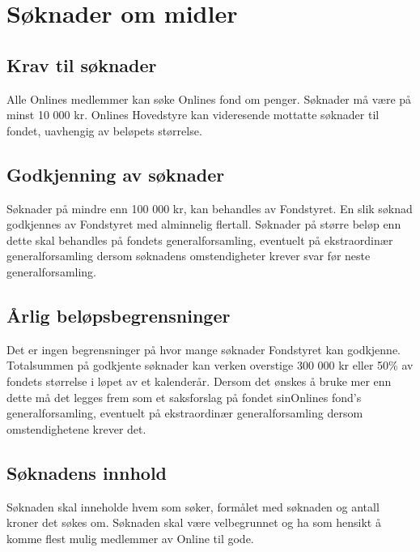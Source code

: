 \chapter{Søknader om midler}

\section{Krav til søknader}

Alle Onlines medlemmer kan søke Onlines fond om penger. Søknader må være på minst 10 000 kr. Onlines Hovedstyre kan videresende mottatte søknader til fondet, uavhengig av beløpets størrelse.
\section{Godkjenning av søknader}

Søknader på mindre enn 100 000 kr, kan behandles av Fondstyret. En slik søknad godkjennes av Fondstyret med alminnelig flertall. Søknader på større beløp enn dette skal behandles på fondets generalforsamling, eventuelt på ekstraordinær generalforsamling dersom søknadens omstendigheter krever svar før neste generalforsamling.

\section{Årlig beløpsbegrensninger}

Det er ingen begrensninger på hvor mange søknader Fondstyret kan godkjenne. Totalsummen på godkjente søknader kan verken overstige 300 000 kr eller 50\% av fondets størrelse i løpet av et kalenderår. Dersom det ønskes å bruke mer enn dette må det legges frem som et saksforslag på fondet sinOnlines fond’s generalforsamling, eventuelt på ekstraordinær generalforsamling dersom omstendighetene krever det.

\section{Søknadens innhold}
Søknaden skal inneholde hvem som søker, formålet med søknaden og antall kroner det søkes om. Søknaden skal være velbegrunnet og ha som hensikt å komme flest mulig medlemmer av Online til gode.
